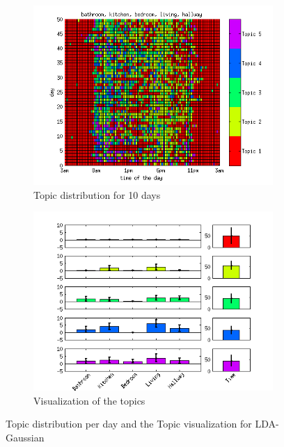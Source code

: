 \documentclass[11pt,a4paper]{article}
\begin{document}
\begin{figure}
 \centering
 \begin{subfigure}[b]{0.45\linewidth}
  \centering
  \includegraphics[width=\textwidth]{Pictures/TopDayTS96k5Gaus.png}
  \caption{Topic distribution for 10 days}
 \end{subfigure}
 \begin{subfigure}[b]{0.45\linewidth}
  \centering
  \includegraphics[width=\textwidth]{Pictures/TopVisuTS96k5Gaus.png}
  \caption{Visualization of the topics}
  \label{fig:GausTopVisu96}
 \end{subfigure}
 \caption{Topic distribution per day and the Topic visualization for LDA-Gaussian}
 \label{fig:Gaus96}
\end{figure}
\end{document}
